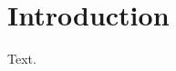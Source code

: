 \documentclass{article}
\begin{document}
\begin{abstract}
We study codes.

We find a threshold.
\end{abstract}
\section{Introduction}Text.
\end{document}

